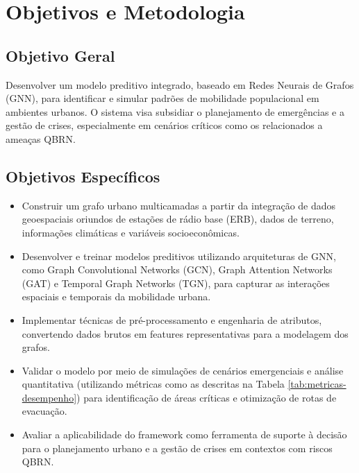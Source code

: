 \chapter{Objetivos e Metodologia}
\label{chap:objetivos}

\section{Objetivo Geral}
Desenvolver um modelo preditivo integrado, baseado em Redes Neurais de Grafos (\gls{GNN}), para identificar e simular padrões de mobilidade populacional em ambientes urbanos. O sistema visa subsidiar o planejamento de emergências e a gestão de crises, especialmente em cenários críticos como os relacionados a ameaças \gls{QBRN}.

\section{Objetivos Específicos}
\begin{itemize}[noitemsep]
    \item Construir um grafo urbano multicamadas a partir da integração de dados geoespaciais oriundos de estações de rádio base (\gls{ERB}), dados de terreno, informações climáticas e variáveis socioeconômicas.
    \item Desenvolver e treinar modelos preditivos utilizando arquiteturas de \gls{GNN}, como Graph Convolutional Networks (GCN), Graph Attention Networks (GAT) e Temporal Graph Networks (TGN), para capturar as interações espaciais e temporais da mobilidade urbana.
    \item Implementar técnicas de pré-processamento e engenharia de atributos, convertendo dados brutos em features representativas para a modelagem dos grafos.
    \item Validar o modelo por meio de simulações de cenários emergenciais e análise quantitativa (utilizando métricas como as descritas na Tabela \ref{tab:metricas-desempenho}) para identificação de áreas críticas e otimização de rotas de evacuação.
    \item Avaliar a aplicabilidade do framework como ferramenta de suporte à decisão para o planejamento urbano e a gestão de crises em contextos com riscos \gls{QBRN}.
\end{itemize}

